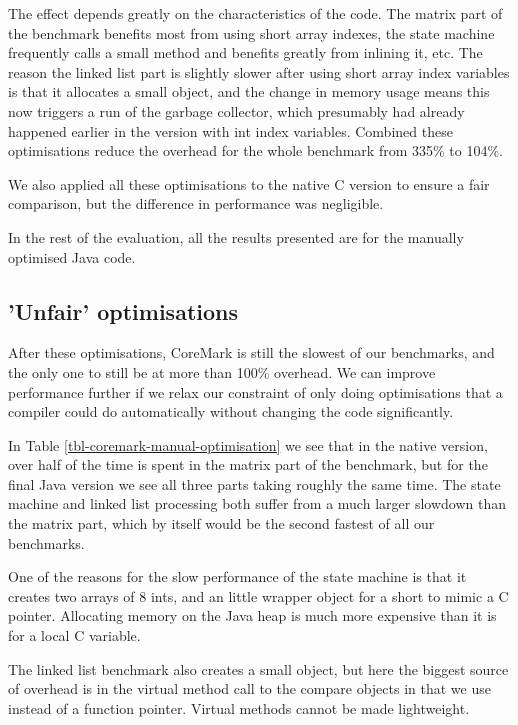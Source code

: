 The effect depends greatly on the characteristics of the code. The matrix part of the benchmark benefits most from using short array indexes, the state machine frequently calls a small method and benefits greatly from inlining it, etc. The reason the linked list part is slightly slower after using short array index variables is that it allocates a small object, and the change in memory usage means this now triggers a run of the garbage collector, which presumably had already happened earlier in the version with int index variables. Combined these optimisations reduce the overhead for the whole benchmark from 335\% to 104\%.

We also applied all these optimisations to the native C version to ensure a fair comparison, but the difference in performance was negligible.

In the rest of the evaluation, all the results presented are for the manually optimised Java code.

\subsection{'Unfair' optimisations}
\label{sec-evaluation-coremark-unfair-optimisations}
After these optimisations, CoreMark is still the slowest of our benchmarks, and the only one to still be at more than 100\% overhead. We can improve performance further if we relax our constraint of only doing optimisations that a compiler could do automatically without changing the code significantly.

In Table \ref{tbl-coremark-manual-optimisation} we see that in the native version, over half of the time is spent in the matrix part of the benchmark, but for the final Java version we see all three parts taking roughly the same time. The state machine and linked list processing both suffer from a much larger slowdown than the matrix part, which by itself would be the second fastest of all our benchmarks.

One of the reasons for the slow performance of the state machine is that it creates two arrays of 8 ints, and an little wrapper object for a short to mimic a C pointer. Allocating memory on the Java heap is much more expensive than it is for a local C variable.

The linked list benchmark also creates a small object, but here the biggest source of overhead is in the virtual method call to the compare objects in  that we use instead of a function pointer. Virtual methods cannot be made lightweight.

